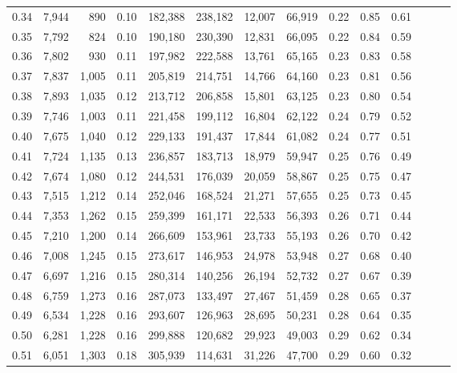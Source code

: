 \begin{tabular}{rrrrrrrrrrrrrr}
0.34 &   7,944 &    890 &  0.10 &  182,388 &  238,182 &  12,007 &  66,919 &  0.22 &  0.85 &      0.61 \\
0.35 &   7,792 &    824 &  0.10 &  190,180 &  230,390 &  12,831 &  66,095 &  0.22 &  0.84 &      0.59 \\
0.36 &   7,802 &    930 &  0.11 &  197,982 &  222,588 &  13,761 &  65,165 &  0.23 &  0.83 &      0.58 \\
0.37 &   7,837 &  1,005 &  0.11 &  205,819 &  214,751 &  14,766 &  64,160 &  0.23 &  0.81 &      0.56 \\
0.38 &   7,893 &  1,035 &  0.12 &  213,712 &  206,858 &  15,801 &  63,125 &  0.23 &  0.80 &      0.54 \\
0.39 &   7,746 &  1,003 &  0.11 &  221,458 &  199,112 &  16,804 &  62,122 &  0.24 &  0.79 &      0.52 \\
0.40 &   7,675 &  1,040 &  0.12 &  229,133 &  191,437 &  17,844 &  61,082 &  0.24 &  0.77 &      0.51 \\
0.41 &   7,724 &  1,135 &  0.13 &  236,857 &  183,713 &  18,979 &  59,947 &  0.25 &  0.76 &      0.49 \\
0.42 &   7,674 &  1,080 &  0.12 &  244,531 &  176,039 &  20,059 &  58,867 &  0.25 &  0.75 &      0.47 \\
0.43 &   7,515 &  1,212 &  0.14 &  252,046 &  168,524 &  21,271 &  57,655 &  0.25 &  0.73 &      0.45 \\
0.44 &   7,353 &  1,262 &  0.15 &  259,399 &  161,171 &  22,533 &  56,393 &  0.26 &  0.71 &      0.44 \\
0.45 &   7,210 &  1,200 &  0.14 &  266,609 &  153,961 &  23,733 &  55,193 &  0.26 &  0.70 &      0.42 \\
0.46 &   7,008 &  1,245 &  0.15 &  273,617 &  146,953 &  24,978 &  53,948 &  0.27 &  0.68 &      0.40 \\
0.47 &   6,697 &  1,216 &  0.15 &  280,314 &  140,256 &  26,194 &  52,732 &  0.27 &  0.67 &      0.39 \\
0.48 &   6,759 &  1,273 &  0.16 &  287,073 &  133,497 &  27,467 &  51,459 &  0.28 &  0.65 &      0.37 \\
0.49 &   6,534 &  1,228 &  0.16 &  293,607 &  126,963 &  28,695 &  50,231 &  0.28 &  0.64 &      0.35 \\
0.50 &   6,281 &  1,228 &  0.16 &  299,888 &  120,682 &  29,923 &  49,003 &  0.29 &  0.62 &      0.34 \\
0.51 &   6,051 &  1,303 &  0.18 &  305,939 &  114,631 &  31,226 &  47,700 &  0.29 &  0.60 &      0.32 \\

\end{tabular}
